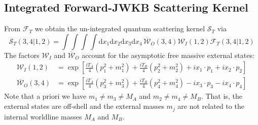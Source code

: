 \subsection{Integrated Forward-JWKB Scattering Kernel}
From $\mathcal{F}_{T}$ we obtain the un-integrated quantum scattering kernel $\mathcal{S}_{T}$ via
\begin{equation}
	\mathcal{S}_{T}(3, 4|1, 2) = \int \int \int \int \mathrm{d}x_{1} \mathrm{d}x_{2} \mathrm{d}x_{3} \mathrm{d}x_{4} \, \overline{\mathcal{W}}_{O}(3, 4) \mathcal{W}_{I}(1, 2) \mathcal{F}_{T}(3, 4|1, 2) \label{STTF}
\end{equation}
The factors $\mathcal{W}_{I}$ and $\overline{\mathcal{W}}_{O}$ account for the asymptotic free massive external states:
\begin{align}
	\mathcal{W}_{I}(1, 2) &= \exp{\left[ \frac{i T_{A}}{4} \left( p_{1}^{2} + m_{1}^{2} \right) + \frac{i T_{B}}{4} \left( p_{2}^{2} + m_{2}^{2} \right) + i x_{1} \cdot p_{1} + i x_{2} \cdot p_{2} \right]} \\
	\overline{\mathcal{W}}_{O}(3, 4) &= \exp{\left[ \frac{i T_{A}}{4} \left( p_{3}^{2} + m_{3}^{2} \right) + \frac{i T_{B}}{4} \left( p_{4}^{2} + m_{4}^{2} \right) - i x_{3} \cdot p_{3} - i x_{4} \cdot p_{4} \right]}
\end{align}
Note that a priori we have $m_{1} \neq m_{3} \neq M_{A}$ and $m_{2} \neq m_{4} \neq M_{B}$. That is, the external states are off-shell and the external masses $m_{j}$ are not related to the internal worldline masses $M_{A}$ and $M_{B}$.

